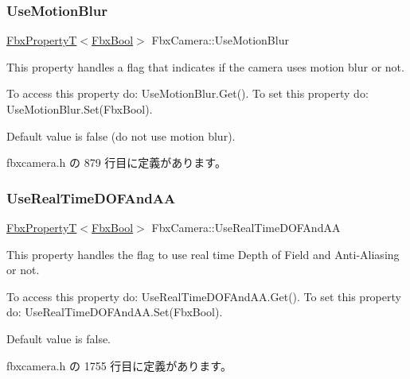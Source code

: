 \mbox{\label{class_fbx_camera_a73d5041546de951978b9065f7b0789a4}} 
\subsubsection{\texorpdfstring{Use\+Motion\+Blur}{UseMotionBlur}}
{\footnotesize\ttfamily \hyperlink{class_fbx_property_t}{Fbx\+PropertyT}$<$\hyperlink{fbxtypes_8h_a92e0562b2fe33e76a242f498b362262e}{Fbx\+Bool}$>$ Fbx\+Camera\+::\+Use\+Motion\+Blur}

This property handles a flag that indicates if the camera uses motion blur or not.

To access this property do\+: Use\+Motion\+Blur.\+Get(). To set this property do\+: Use\+Motion\+Blur.\+Set(\+Fbx\+Bool).

Default value is false (do not use motion blur). 

 fbxcamera.\+h の 879 行目に定義があります。

\mbox{\label{class_fbx_camera_a57b4706a5d4d2678c5e31430b9a4ba61}} 
\subsubsection{\texorpdfstring{Use\+Real\+Time\+D\+O\+F\+And\+AA}{UseRealTimeDOFAndAA}}
{\footnotesize\ttfamily \hyperlink{class_fbx_property_t}{Fbx\+PropertyT}$<$\hyperlink{fbxtypes_8h_a92e0562b2fe33e76a242f498b362262e}{Fbx\+Bool}$>$ Fbx\+Camera\+::\+Use\+Real\+Time\+D\+O\+F\+And\+AA}

This property handles the flag to use real time Depth of Field and Anti-\/\+Aliasing or not.

To access this property do\+: Use\+Real\+Time\+D\+O\+F\+And\+A\+A.\+Get(). To set this property do\+: Use\+Real\+Time\+D\+O\+F\+And\+A\+A.\+Set(\+Fbx\+Bool).

Default value is false. 

 fbxcamera.\+h の 1755 行目に定義があります。

\mbox{\label{class_fbx_camera_a99d0cb2281144454e44128d66be54b26}} 
